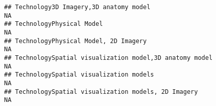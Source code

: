 \documentclass[]{article}
\begin{document}
\begin{verbatim}
## Technology3D Imagery,3D anatomy model                                                                                                                                                                                                                                                                                                                                                                                                                                                NA
## TechnologyPhysical Model                                                                                                                                                                                                                                                                                                                                                                                                                                                             NA
## TechnologyPhysical Model, 2D Imagery                                                                                                                                                                                                                                                                                                                                                                                                                                                 NA
## TechnologySpatial visualization model,3D anatomy model                                                                                                                                                                                                                                                                                                                                                                                                                               NA
## TechnologySpatial visualization models                                                                                                                                                                                                                                                                                                                                                                                                                                               NA
## TechnologySpatial visualization models, 2D Imagery                                                                                                                                                                                                                                                                                                                                                                                                                                   NA

\end{verbatim}
\end{document}
